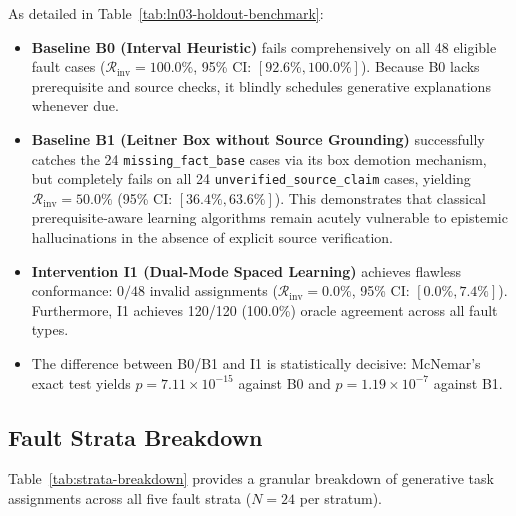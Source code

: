 \documentclass[11pt,a4paper]{article}
\begin{document}


As detailed in Table~\ref{tab:ln03-holdout-benchmark}:
\begin{itemize}[leftmargin=*]
    \item \textbf{Baseline B0 (Interval Heuristic)} fails comprehensively on all 48 eligible fault cases ($\mathcal{R}_{\text{inv}} = 100.0\%$, 95\% CI: $[92.6\%, 100.0\%]$). Because B0 lacks prerequisite and source checks, it blindly schedules generative explanations whenever due.
    \item \textbf{Baseline B1 (Leitner Box without Source Grounding)} successfully catches the 24 \texttt{missing\_fact\_base} cases via its box demotion mechanism, but completely fails on all 24 \texttt{unverified\_source\_claim} cases, yielding $\mathcal{R}_{\text{inv}} = 50.0\%$ (95\% CI: $[36.4\%, 63.6\%]$). This demonstrates that classical prerequisite-aware learning algorithms remain acutely vulnerable to epistemic hallucinations in the absence of explicit source verification.
    \item \textbf{Intervention I1 (Dual-Mode Spaced Learning)} achieves flawless conformance: $0/48$ invalid assignments ($\mathcal{R}_{\text{inv}} = 0.0\%$, 95\% CI: $[0.0\%, 7.4\%]$). Furthermore, I1 achieves 120/120 (100.0\%) oracle agreement across all fault types.
    \item The difference between B0/B1 and I1 is statistically decisive: McNemar's exact test yields $p = 7.11 \times 10^{-15}$ against B0 and $p = 1.19 \times 10^{-7}$ against B1.
\end{itemize}

\subsection{Fault Strata Breakdown}
Table~\ref{tab:strata-breakdown} provides a granular breakdown of generative task assignments across all five fault strata ($N=24$ per stratum).
\end{document}
